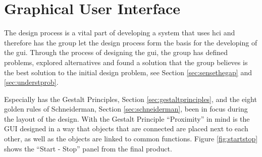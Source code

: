 



\section{Graphical User Interface}
The design process is a vital part of developing a system that uses \acrfull{hci} and therefore has the group let the design process form the basis for the developing of the \acrlong{gui}. Through the process of designing the \acrshort{gui}, the group has defined problems, explored alternatives and found a solution that the group believes is the best solution to the initial design problem, see Section \ref{sec:sensethegap} and \ref{sec:understprob}.

Especially has the Gestalt Principles, Section \ref{sec:gestaltprinciples}, and the eight golden rules of Schneiderman, Section \ref{sec:schneiderman}, been in focus during the layout of the design. With the Gestalt Principle ``Proximity'' in mind is the GUI designed in a way that objects that are connected are placed next to each other, as well as the objects are linked to common functions. Figure \ref{fig:startstop} shows the ``Start - Stop'' panel from the final product. 


